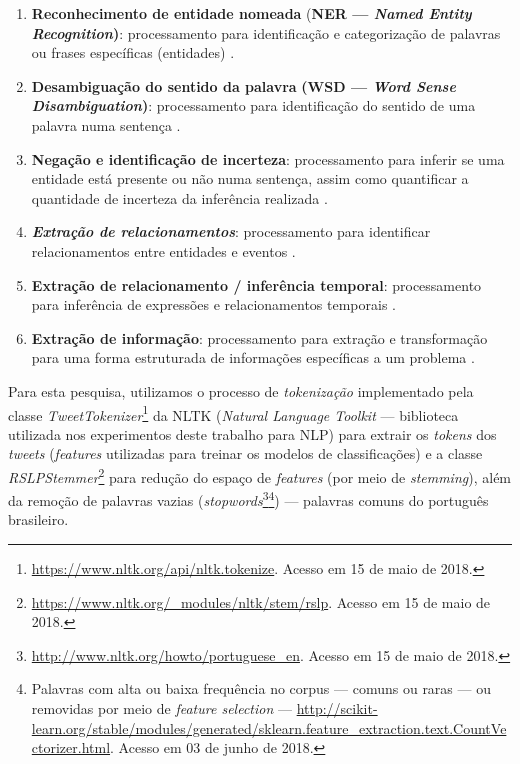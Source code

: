 \documentclass[
	12pt,				%
	oneside,			%
	a4paper,			%
	english,			%
	brazil				%
	]{abntex2ppgsi}
\begin{document}
{\begin{enumerate}
\begin{enumerate}
\item{}\textbf{Reconhecimento de entidade nomeada} {(\textbf{NER --- \textit{Named Entity Recognition})}:} processamento para identificação e categorização de palavras ou frases específicas (entidades) \cite{nadkarni2011natural}.
\item{} {\textbf{Desambiguação do sentido da palavra} \textbf{(WSD --- \textit{Word Sense Disambiguation})}:} processamento para identificação do sentido de uma palavra numa sentença \cite{nadkarni2011natural}. 
\item \textbf{Negação e identificação de incerteza}: processamento para inferir se uma entidade está presente ou não numa sentença, assim como quantificar a quantidade de incerteza da inferência realizada \cite{nadkarni2011natural}.
\item \textbf{\textit{Extração de relacionamentos}}: processamento para identificar relacionamentos entre entidades e eventos \cite{nadkarni2011natural}.
\item \textbf{Extração de relacionamento / inferência temporal}: processamento para inferência de expressões e relacionamentos temporais \cite{nadkarni2011natural}.
\item \textbf{Extração de informação}: processamento para extração e transformação para uma forma estruturada de informações específicas a um problema \cite{nadkarni2011natural}.
\end{enumerate}
\end{enumerate}

Para esta pesquisa, utilizamos o processo de \textit{tokenização} implementado pela classe \textit{TweetTokenizer}\footnote {\url{https://www.nltk.org/api/nltk.tokenize}. Acesso em 15 de maio de 2018.} da NLTK (\textit{Natural Language Toolkit} --- biblioteca utilizada nos experimentos deste trabalho para NLP) para extrair os \textit{tokens} dos \textit{tweets} (\textit{features} utilizadas para treinar os modelos de classificações) e a classe \textit {RSLPStemmer}\footnote{\url{https://www.nltk.org/\_modules/nltk/stem/rslp}. Acesso em 15 de maio de 2018.} para redução do espaço de \textit{features} (por meio de \textit{stemming}), além da remoção de palavras vazias (\textit{stopwords}\footnote{\url{http://www.nltk.org/howto/portuguese\_en}. Acesso em 15 de maio de 2018.}\footnote{Palavras com alta ou baixa frequência no corpus --- comuns ou raras --- ou removidas por meio de \textit{feature selection} --- \url{http://scikit-learn.org/stable/modules/generated/sklearn.feature_extraction.text.CountVectorizer.html}. Acesso em 03 de junho de 2018.}) --- palavras comuns do português brasileiro.

}
\end{document}
